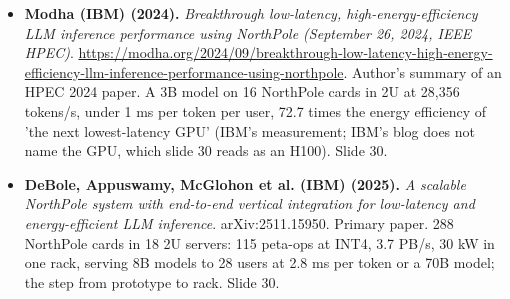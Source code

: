 \documentclass[11pt,letterpaper]{article}
\begin{document}
\begin{itemize}[leftmargin=1.2em,itemsep=3pt]
\item \textbf{Modha (IBM) (2024).} \textit{Breakthrough low-latency, high-energy-efficiency LLM inference performance using NorthPole (September 26, 2024, IEEE HPEC)}. \url{https://modha.org/2024/09/breakthrough-low-latency-high-energy-efficiency-llm-inference-performance-using-northpole}. Author's summary of an HPEC 2024 paper. A 3B model on 16 NorthPole cards in 2U at 28,356 tokens/s, under 1 ms per token per user, 72.7 times the energy efficiency of 'the next lowest-latency GPU' (IBM's measurement; IBM's blog does not name the GPU, which slide 30 reads as an H100). Slide 30.
\item \textbf{DeBole, Appuswamy, McGlohon et al. (IBM) (2025).} \textit{A scalable NorthPole system with end-to-end vertical integration for low-latency and energy-efficient LLM inference}. arXiv:2511.15950. Primary paper. 288 NorthPole cards in 18 2U servers: 115 peta-ops at INT4, 3.7 PB/s, 30 kW in one rack, serving 8B models to 28 users at 2.8 ms per token or a 70B model; the step from prototype to rack. Slide 30.
\end{itemize}
\end{document}
